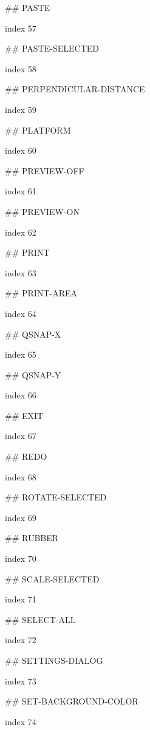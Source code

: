 ## PASTE

index 57



## PASTE-SELECTED

index 58



## PERPENDICULAR-DISTANCE

index 59



## PLATFORM

index 60



## PREVIEW-OFF

index 61



## PREVIEW-ON

index 62



## PRINT

index 63



## PRINT-AREA

index 64



## QSNAP-X

index 65



## QSNAP-Y

index 66



## EXIT

 index 67



## REDO

index 68



## ROTATE-SELECTED

index 69



## RUBBER

index 70



## SCALE-SELECTED

index 71



## SELECT-ALL

index 72



## SETTINGS-DIALOG

index 73



## SET-BACKGROUND-COLOR

index 74



